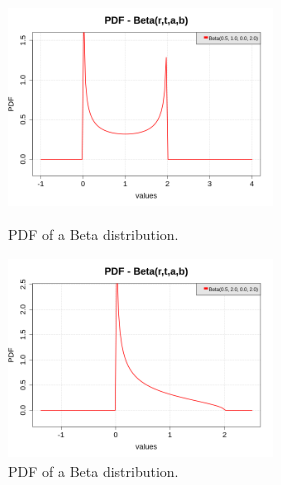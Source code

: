 {\begin{itemize}
\begin{figure}[H]
\begin{minipage}{8cm}
\begin{center}
\includegraphics[width=7cm]{Figures/pdf_Beta_5.png}
\caption{PDF of a Beta distribution.}
\end{center}
\end{minipage}
\hfill
\begin{minipage}{8cm}
\begin{center}
\includegraphics[width=7cm]{Figures/pdf_Beta_6.png}
\caption{PDF of a Beta distribution.}
\end{center}
\end{minipage}
\end{figure}




\end{itemize}}
